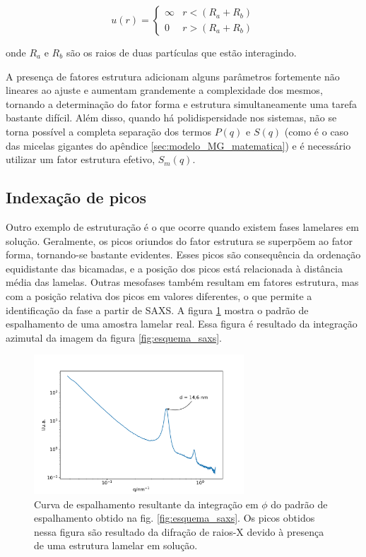 		\begin{equation}
			u(r) = 
			\begin{cases}
				\infty  & r < (R_a + R_b) \\
				0		& r > (R_a + R_b)
			\end{cases}
			\label{eqn:potencial_esfera_rígida}
		\end{equation}

		\noindent onde \(R_a\) e \(R_b\) são os raios de duas partículas que estão interagindo.
		
		A presença de fatores estrutura adicionam alguns parâmetros fortemente não lineares ao ajuste e aumentam grandemente a complexidade dos mesmos, tornando a determinação do fator forma e estrutura simultaneamente uma tarefa bastante difícil. Além disso, quando há polidispersidade nos sistemas, não se torna possível a completa separação dos termos \(P(q)\) e \(S(q)\) (como é o caso das micelas gigantes do apêndice \ref{sec:modelo_MG_matematica}) e é necessário utilizar um fator estrutura efetivo, \(S_m(q)\).
		
		\subsection{Indexação de picos}
		\label{sec:teoria_SAXS}
		
		Outro exemplo de estruturação é o que ocorre quando existem fases lamelares em solução. Geralmente, os picos oriundos do fator estrutura se superpõem ao fator forma, tornando-se bastante evidentes. Esses picos são consequência da ordenação equidistante das bicamadas, e a posição dos picos está relacionada à distância média das lamelas. Outras mesofases também resultam em fatores estrutura, mas com a posição relativa dos picos em valores diferentes, o que permite a identificação da fase a partir de SAXS. A figura \ref{fig:exemplo_saxs} mostra o padrão de espalhamento de uma amostra lamelar real. Essa figura é resultado da integração azimutal da imagem da figura \ref{fig:esquema_saxs}.
		
		\begin{figure}[h]
			\centering
			\includegraphics[width=0.7\textwidth]{imagens/saxs/exemplo_SAXS}
			\caption{Curva de espalhamento resultante da integração em \(\phi\) do padrão de espalhamento obtido na fig. \ref{fig:esquema_saxs}. Os picos obtidos nessa figura são resultado da difração de raios-X devido à presença de uma estrutura lamelar em solução.}
			\label{fig:exemplo_saxs}
		\end{figure}
		
